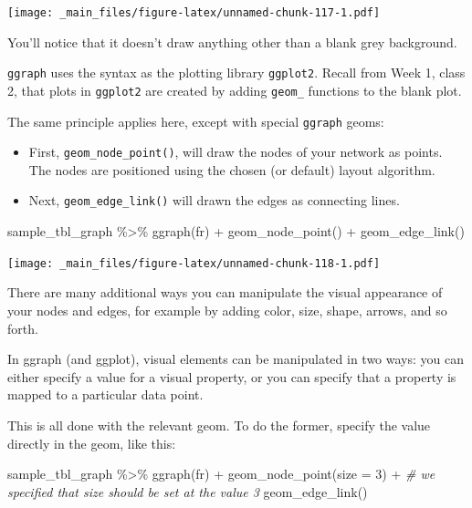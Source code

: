 \documentclass[
]{book}
\newenvironment{Shaded}{\begin{snugshade}}{\end{snugshade}}
\newcommand{\AttributeTok}[1]{\textcolor[rgb]{0.77,0.63,0.00}{#1}}
\newcommand{\CommentTok}[1]{\textcolor[rgb]{0.56,0.35,0.01}{\textit{#1}}}
\newcommand{\DecValTok}[1]{\textcolor[rgb]{0.00,0.00,0.81}{#1}}
\newcommand{\FunctionTok}[1]{\textcolor[rgb]{0.00,0.00,0.00}{#1}}
\newcommand{\NormalTok}[1]{#1}
\newcommand{\SpecialCharTok}[1]{\textcolor[rgb]{0.00,0.00,0.00}{#1}}
\newcommand{\StringTok}[1]{\textcolor[rgb]{0.31,0.60,0.02}{#1}}
\begin{document}
\texttt{[image: \_main\_files/figure-latex/unnamed-chunk-117-1.pdf]}

You'll notice that it doesn't draw anything other than a blank grey background.

\texttt{ggraph} uses the syntax as the plotting library \texttt{ggplot2}. Recall from Week 1, class 2, that plots in \texttt{ggplot2} are created by adding \texttt{geom\_} functions to the blank plot.

The same principle applies here, except with special \texttt{ggraph} geoms:

\begin{itemize}
\item
  First, \texttt{geom\_node\_point()}, will draw the nodes of your network as points. The nodes are positioned using the chosen (or default) layout algorithm.
\item
  Next, \texttt{geom\_edge\_link()} will drawn the edges as connecting lines.
\end{itemize}

\begin{Shaded}
\begin{Highlighting}[]
\NormalTok{sample\_tbl\_graph }\SpecialCharTok{\%\textgreater{}\%} 
  \FunctionTok{ggraph}\NormalTok{(}\StringTok{\textquotesingle{}fr\textquotesingle{}}\NormalTok{) }\SpecialCharTok{+} 
  \FunctionTok{geom\_node\_point}\NormalTok{() }\SpecialCharTok{+} 
  \FunctionTok{geom\_edge\_link}\NormalTok{()}
\end{Highlighting}
\end{Shaded}

\texttt{[image: \_main\_files/figure-latex/unnamed-chunk-118-1.pdf]}

There are many additional ways you can manipulate the visual appearance of your nodes and edges, for example by adding color, size, shape, arrows, and so forth.

In ggraph (and ggplot), visual elements can be manipulated in two ways: you can either specify a value for a visual property, or you can specify that a property is mapped to a particular data point.

This is all done with the relevant geom. To do the former, specify the value directly in the geom, like this:

\begin{Shaded}
\begin{Highlighting}[]
\NormalTok{sample\_tbl\_graph }\SpecialCharTok{\%\textgreater{}\%} 
  \FunctionTok{ggraph}\NormalTok{(}\StringTok{\textquotesingle{}fr\textquotesingle{}}\NormalTok{) }\SpecialCharTok{+} 
  \FunctionTok{geom\_node\_point}\NormalTok{(}\AttributeTok{size =} \DecValTok{3}\NormalTok{) }\SpecialCharTok{+} \CommentTok{\# we specified that size should be set at the value 3}
  \FunctionTok{geom\_edge\_link}\NormalTok{()}
\end{Highlighting}
\end{Shaded}
\end{document}
